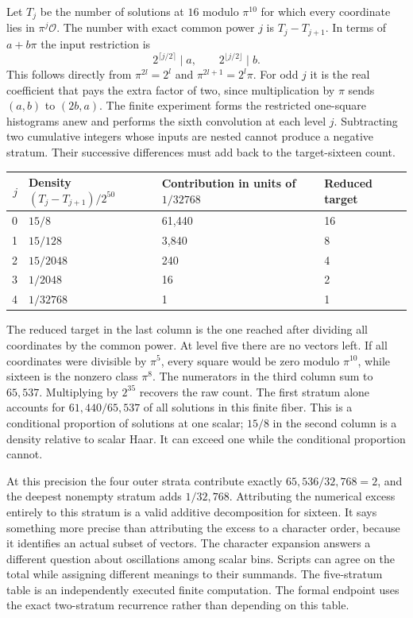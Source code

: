 \documentclass[12pt,letterpaper]{article}
\begin{document}
Let $T_j$ be the number of solutions at $16$ modulo $\pi^{10}$ for which every coordinate lies in $\pi^j\mathcal O$. The number with exact common power $j$ is $T_j-T_{j+1}$. In terms of $a+b\pi$ the input restriction is
\[
  2^{\lceil j/2\rceil}\mid a,\qquad
  2^{\lfloor j/2\rfloor}\mid b .
\]
This follows directly from $\pi^{2l}=2^l$ and $\pi^{2l+1}=2^l\pi$. For odd $j$ it is the real coefficient that pays the extra factor of two, since multiplication by $\pi$ sends $(a,b)$ to $(2b,a)$. The finite experiment forms the restricted one-square histograms anew and performs the sixth convolution at each level $j$. Subtracting two cumulative integers whose inputs are nested cannot produce a negative stratum. Their successive differences must add back to the target-sixteen count.

\begin{center}\small\begin{tabular}{rlll}\toprule
$j$&Density $(T_j-T_{j+1})/2^{50}$&Contribution in units of $1/32768$&Reduced target\\\midrule
0&$15/8$&61,440&16\\
1&$15/128$&3,840&8\\
2&$15/2048$&240&4\\
3&$1/2048$&16&2\\
4&$1/32768$&1&1\\\bottomrule
\end{tabular}\end{center}
The reduced target in the last column is the one reached after dividing all coordinates by the common power. At level five there are no vectors left. If all coordinates were divisible by $\pi^5$, every square would be zero modulo $\pi^{10}$, while sixteen is the nonzero class $\pi^8$. The numerators in the third column sum to $65{,}537$. Multiplying by $2^{35}$ recovers the raw count. The first stratum alone accounts for $61{,}440/65{,}537$ of all solutions in this finite fiber. This is a conditional proportion of solutions at one scalar; $15/8$ in the second column is a density relative to scalar Haar. It can exceed one while the conditional proportion cannot.

At this precision the four outer strata contribute exactly $65{,}536/32{,}768=2$, and the deepest nonempty stratum adds $1/32{,}768$. Attributing the numerical excess entirely to this stratum is a valid additive decomposition for sixteen. It says something more precise than attributing the excess to a character order, because it identifies an actual subset of vectors. The character expansion answers a different question about oscillations among scalar bins. Scripts can agree on the total while assigning different meanings to their summands. The five-stratum table is an independently executed finite computation. The formal endpoint uses the exact two-stratum recurrence rather than depending on this table.
\end{document}

